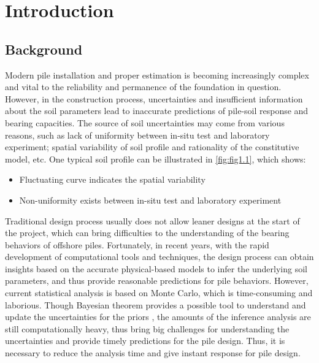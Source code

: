 \chapter{Introduction}

\section{Background}

Modern pile installation and proper estimation is becoming increasingly complex and vital to the reliability and permanence of the foundation in question. However, in the construction process, uncertainties and insufficient information about the soil parameters lead to inaccurate predictions of pile-soil response and bearing capacities. The source of soil uncertainties may come from various reasons, such as lack of uniformity between in-situ test and laboratory experiment; spatial variability of soil
 profile and rationality of the constitutive model, etc. One typical soil profile can be illustrated in \cref{fig:fig1.1}, which shows:

\setlength{\parskip}{0pt}

\begin{itemize}

    \item Fluctuating curve indicates the spatial  variability
    \item Non-uniformity exists between in-situ test and laboratory experiment

\end{itemize}

Traditional design process usually does not allow leaner designs at the start of the project, which can bring difficulties to the understanding of the bearing behaviors of offshore piles. Fortunately, in recent years, with the rapid development of computational tools and techniques, the design process can obtain insights based on the accurate physical-based models to infer the underlying soil parameters, and thus provide reasonable predictions for pile behaviors. However, current statistical analysis is based on Monte Carlo, which is time-consuming and laborious. Though Bayesian theorem provides a possible tool to understand and update the uncertainties for the priors \citep{tarantola2005}, the amounts of the inference analysis are still computationally heavy, thus bring big challenges for understanding the uncertainties and provide timely predictions for the pile design. Thus, it is necessary to reduce the analysis time and give instant response for pile design.

